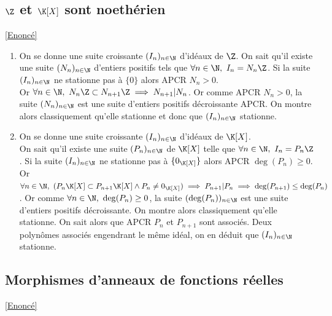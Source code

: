\documentclass[8pt]{book}
\begin{document}
	\subsection{$\Z$ et $\K[X]$ sont noethérien}
	\label{Z et K{X} sont noethériens corrigé}
	\textcolor{blue}{\hyperref[Z et K{X} sont noethériens]{[Enoncé]}}\\
	\begin{enumerate}[leftmargin=*]
		\item On se donne une suite croissante $(I_n)_{n\in \N}$ d'idéaux de $\Z$. On sait qu'il existe une suite $(N_n)_{n\in \N}$ d'entiers positifs tels que $\forall n\in \N,\ I_n=N_n\Z$. Si la suite $(I_n)_{n\in \N}$ ne stationne pas à $\{0\}$ alors APCR $N_n>0$.\\
		Or $\forall n\in \N,\ N_n\Z\subset N_{n+1}\Z\implies N_{n+1}|N_n$. Or comme APCR $N_n>0$, la suite $(N_n)_{n\in \N}$ est une suite d'entiers positifs décroissante APCR. On montre alors classiquement qu'elle stationne et donc que $(I_n)_{n\in \N}$ stationne.
		\item On se donne une suite croissante $(I_n)_{n\in \N}$ d'idéaux de $\K[X]$.\\
		On sait qu'il existe une suite $(P_n)_{n\in \N}$ de $\K[X]$ telle que $\forall n\in \N,\ I_n=P_n\Z$. Si la suite $(I_n)_{n\in \N}$ ne stationne pas à $\{0_{\K[X]}\}$ alors APCR $\deg(P_n)\geq 0$.\\
		Or $\forall n\in \N,\ (P_n\K[X]\subset P_{n+1}\K[X]\land P_n\ne 0_{\K[X]})\implies P_{n+1}|P_n\implies \deg(P_{n+1})\leq \deg(P_n)$. Or comme $\forall n\in \N,\ \deg(P_n)\geq 0$, la suite $(\deg(P_n))_{n\in \N}$ est une suite d'entiers positifs décroissante. On montre alors classiquement qu'elle stationne. On sait alors que APCR $P_n$ et $P_{n+1}$ sont associés. Deux polynômes associés engendrant le même idéal, on en déduit que $(I_n)_{n\in \N}$ stationne.
	\end{enumerate}
	
	\subsection{Morphismes d'anneaux de fonctions réelles}
	\label{Morphismes d'anneaux de fonctions réelles corrigé}
	\textcolor{blue}{\hyperref[Morphismes d'anneaux de fonctions réelles]{[Enoncé]}}\\
	
\end{document}

